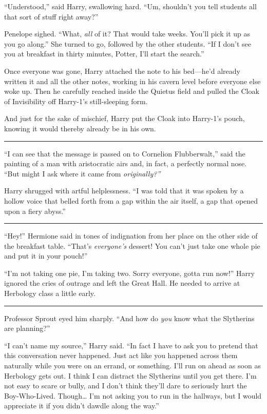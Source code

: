 ``Understood,'' said Harry, swallowing hard. ``Um, shouldn't you tell
students all that sort of stuff right away?''

Penelope sighed. ``What, \emph{all} of it? That would take weeks. You'll
pick it up as you go along.'' She turned to go, followed by the other
students. ``If I don't see you at breakfast in thirty minutes, Potter,
I'll start the search.''

Once everyone was gone, Harry attached the note to his bed---he'd
already written it and all the other notes, working in his cavern level
before everyone else woke up. Then he carefully reached inside the
Quietus field and pulled the Cloak of Invisibility off Harry-1's
still-sleeping form.

And just for the sake of mischief, Harry put the Cloak into Harry-1's
pouch, knowing it would thereby already be in his own.

\begin{center}\rule{3in}{0.4pt}\end{center}

``I can see that the message is passed on to Cornelion Flubberwalt,''
said the painting of a man with aristocratic airs and, in fact, a
perfectly normal nose. ``But might I ask where it came from
\emph{originally?''}

Harry shrugged with artful helplessness. ``I was told that it was spoken
by a hollow voice that belled forth from a gap within the air itself, a
gap that opened upon a fiery abyss.''

\begin{center}\rule{3in}{0.4pt}\end{center}

``Hey!'' Hermione said in tones of indignation from her place on the
other side of the breakfast table. ``That's \emph{everyone's} dessert!
You can't just take one whole pie and put it in your pouch!''

``I'm not taking one pie, I'm taking two. Sorry everyone, gotta run
now!'' Harry ignored the cries of outrage and left the Great Hall. He
needed to arrive at Herbology class a little early.

\begin{center}\rule{3in}{0.4pt}\end{center}

Professor Sprout eyed him sharply. ``And how do \emph{you} know what the
Slytherins are planning?''

``I can't name my source,'' Harry said. ``In fact I have to ask you to
pretend that this conversation never happened. Just act like you
happened across them naturally while you were on an errand, or
something. I'll run on ahead as soon as Herbology gets out. I think I
can distract the Slytherins until you get there. I'm not easy to scare
or bully, and I don't think they'll dare to seriously hurt the
Boy-Who-Lived. Though\ldots{} I'm not asking you to run in the hallways,
but I would appreciate it if you didn't dawdle along the way.''

